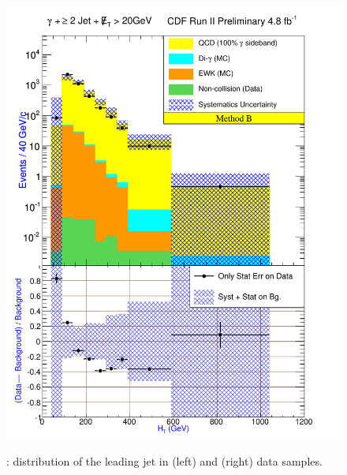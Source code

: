 \documentclass[11pt]{article}
\begin{document}
\begin{figure}[h!]
{ \includegraphics[scale=\resultsHistScale,keepaspectratio=true]{./g30jetmet20_MtdB_plot2_Ht.pdf}
}
 \caption{: \Ht distribution of the leading jet in \phoonejetmettwenty (left) and \photwojetmettwenty (right) data samples.}
 \label{fig:Result_MtdB_gj1Met20_Ht}
\end{figure}
\end{document}
